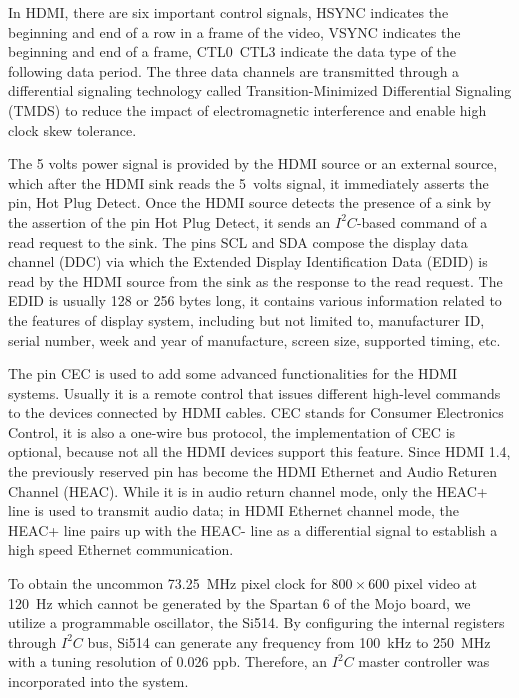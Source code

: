 \documentclass[]{spie}  %
\begin{document}
In HDMI, there are six important control signals, HSYNC indicates the beginning and end of a row in a frame of the video, VSYNC indicates the beginning and end of a frame, CTL0~CTL3 indicate the data type of the following data period. The three data channels are transmitted through a differential signaling technology called Transition-Minimized Differential Signaling (TMDS) to reduce the impact of electromagnetic interference and enable high clock skew tolerance. %

The 5 volts power signal is provided by the HDMI source or an external source, which after the HDMI sink reads the 5~volts signal, it immediately asserts the pin, Hot Plug Detect. Once the HDMI source detects the presence of a sink by the assertion of the pin Hot Plug Detect, it sends an $I^2C$-based command of a read request to the sink. The pins SCL and SDA compose the display data channel (DDC) via which the Extended Display Identification Data (EDID) is read by the HDMI source from the sink as the response to the read request. The EDID is usually 128 or 256 bytes long, it contains various information related to the features of display system, including but not limited to, manufacturer ID, serial number, week and year of manufacture, screen size, supported timing, etc.

The pin CEC is used to add some advanced functionalities for the HDMI systems. Usually it is a remote control that issues different high-level commands to the devices connected by HDMI cables. CEC stands for Consumer Electronics Control, it is also a one-wire bus protocol, the implementation of CEC is optional, because not all the HDMI devices support this feature. Since HDMI 1.4, the previously reserved pin has become the HDMI Ethernet and Audio Returen Channel (HEAC). While it is in audio return channel mode, only the HEAC+ line is used to transmit audio data; in HDMI Ethernet channel mode, the HEAC+ line pairs up with the HEAC- line as a differential signal to establish a high speed Ethernet communication.

To obtain the uncommon 73.25~MHz pixel clock for $800\times 600$ pixel video at 120~Hz which cannot be generated by the Spartan 6 of the Mojo board, we utilize a programmable oscillator, the Si514. By configuring the internal registers through $I^2C$ bus, Si514 can generate any frequency from 100~kHz to 250~MHz with a tuning resolution of 0.026 ppb. Therefore, an $I^2C$ master controller was incorporated into the system.%
\end{document}
